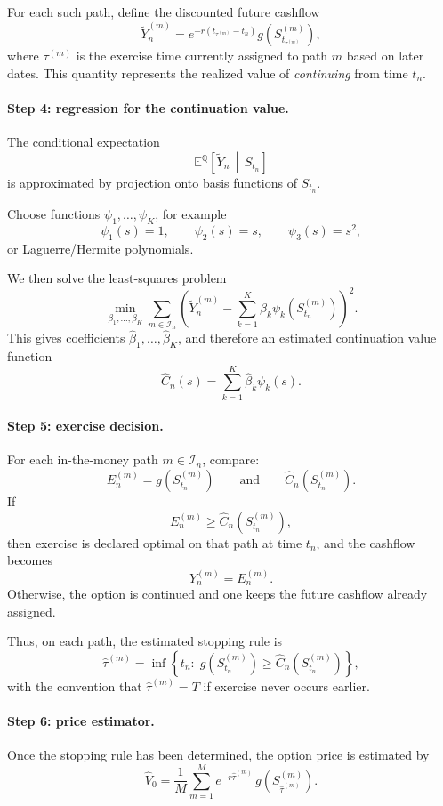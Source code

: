 \documentclass[11pt]{article}
\newcommand{\Qbb}{\mathbb{Q}}
\theoremstyle{definition}
\theoremstyle{plain}
\begin{document}
For each such path, define the discounted future cashflow
\[
\widetilde Y_n^{(m)}
=
e^{-r(t_{\tau^{(m)}}-t_n)}
g\!\left(S_{t_{\tau^{(m)}}}^{(m)}\right),
\]
where \(\tau^{(m)}\) is the exercise time currently assigned to path
\(m\) based on later dates.
This quantity represents the realized value of \emph{continuing} from
time \(t_n\).

\paragraph{Step 4: regression for the continuation value.}
The conditional expectation
\[
\mathbb E^{\Qbb}\!\left[
\widetilde Y_n \,\middle|\, S_{t_n}
\right]
\]
is approximated by projection onto basis functions of \(S_{t_n}\).

Choose functions \(\psi_1,\dots,\psi_K\), for example
\[
\psi_1(s)=1,\qquad
\psi_2(s)=s,\qquad
\psi_3(s)=s^2,
\]
or Laguerre/Hermite polynomials.

We then solve the least-squares problem
\[
\min_{\beta_1,\dots,\beta_K}
\sum_{m\in\mathcal I_n}
\left(
\widetilde Y_n^{(m)}
-
\sum_{k=1}^K \beta_k \psi_k(S_{t_n}^{(m)})
\right)^2.
\]
This gives coefficients \(\hat\beta_1,\dots,\hat\beta_K\), and therefore
an estimated continuation value function
\[
\widehat C_n(s)
=
\sum_{k=1}^K \hat\beta_k \psi_k(s).
\]

\paragraph{Step 5: exercise decision.}
For each in-the-money path \(m\in\mathcal I_n\), compare:
\[
E_n^{(m)} = g\!\left(S_{t_n}^{(m)}\right)
\qquad \text{and} \qquad
\widehat C_n\!\left(S_{t_n}^{(m)}\right).
\]
If
\[
E_n^{(m)} \ge \widehat C_n\!\left(S_{t_n}^{(m)}\right),
\]
then exercise is declared optimal on that path at time \(t_n\), and the
cashflow becomes
\[
Y_n^{(m)} = E_n^{(m)}.
\]
Otherwise, the option is continued and one keeps the future cashflow
already assigned.

Thus, on each path, the estimated stopping rule is
\[
\hat\tau^{(m)}
=
\inf\left\{
t_n:\;
g\!\left(S_{t_n}^{(m)}\right)
\ge
\widehat C_n\!\left(S_{t_n}^{(m)}\right)
\right\},
\]
with the convention that \(\hat\tau^{(m)}=T\) if exercise never occurs
earlier.

\paragraph{Step 6: price estimator.}
Once the stopping rule has been determined, the option price is
estimated by
\[
\widehat V_0
=
\frac1M
\sum_{m=1}^M
e^{-r\hat\tau^{(m)}}\,
g\!\left(S_{\hat\tau^{(m)}}^{(m)}\right).
\]
\end{document}
